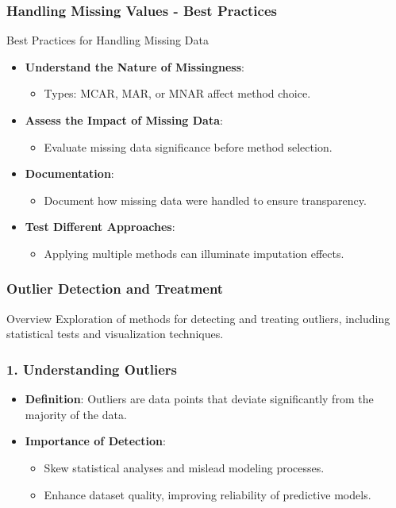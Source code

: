 \documentclass[aspectratio=169]{beamer}
\begin{document}
\begin{frame}[fragile]
    \frametitle{Handling Missing Values - Best Practices}
    \begin{block}{Best Practices for Handling Missing Data}
        \begin{itemize}
            \item \textbf{Understand the Nature of Missingness}:
            \begin{itemize}
                \item Types: MCAR, MAR, or MNAR affect method choice.
            \end{itemize}
            \item \textbf{Assess the Impact of Missing Data}:
            \begin{itemize}
                \item Evaluate missing data significance before method selection.
            \end{itemize}
            \item \textbf{Documentation}:
            \begin{itemize}
                \item Document how missing data were handled to ensure transparency.
            \end{itemize}
            \item \textbf{Test Different Approaches}:
            \begin{itemize}
                \item Applying multiple methods can illuminate imputation effects.
            \end{itemize}
        \end{itemize}
    \end{block}
\end{frame}

\begin{frame}
    \frametitle{Outlier Detection and Treatment}
    \begin{block}{Overview}
        Exploration of methods for detecting and treating outliers, including statistical tests and visualization techniques.
    \end{block}
\end{frame}

\begin{frame}
    \frametitle{1. Understanding Outliers}
    \begin{itemize}
        \item \textbf{Definition}: Outliers are data points that deviate significantly from the majority of the data.
        \item \textbf{Importance of Detection}:
        \begin{itemize}
            \item Skew statistical analyses and mislead modeling processes.
            \item Enhance dataset quality, improving reliability of predictive models.
        \end{itemize}
    \end{itemize}
\end{frame}
\end{document}
